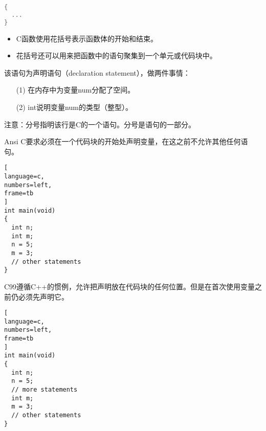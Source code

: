 \begin{frame}[fragile]
 
\begin{lstlisting}[language=c,frame=tb]
{
  ...
}
\end{lstlisting}
 
\begin{itemize}
\item
C函数使用花括号表示函数体的开始和结束。\\[0.2in]
\item
花括号还可以用来把函数中的语句聚集到一个单元或代码块中。
\end{itemize}
\end{frame}

\begin{frame}[fragile]


 
该语句为声明语句（declaration statement），做两件事情：\vspace{0.1in}
\begin{itemize}
\item[(1)]
在内存中为变量num分配了空间。\\[0.1in]
\item[(2)]
int说明变量num的类型（整型）。
\end{itemize} \vspace{0.1in}

\pause 

注意：分号指明该行是C的一个语句。分号是语句的一部分。
 
\end{frame}

\begin{frame}[fragile]
Ansi C要求必须在一个代码块的开始处声明变量，在这之前不允许其他任何语句。

\begin{lstlisting}[
language=c,
numbers=left,
frame=tb
]
int main(void)
{
  int n;
  int m;
  n = 5;
  m = 3;
  // other statements
}
\end{lstlisting}
\end{frame}

\begin{frame}[fragile]
C99遵循C++的惯例，允许把声明放在代码块的任何位置。但是在首次使用变量之前仍必须先声明它。

\begin{lstlisting}[
language=c,
numbers=left,
frame=tb
]
int main(void)
{
  int n;
  n = 5;
  // more statements
  int m;
  m = 3;
  // other statements
}
\end{lstlisting}
\end{frame}


